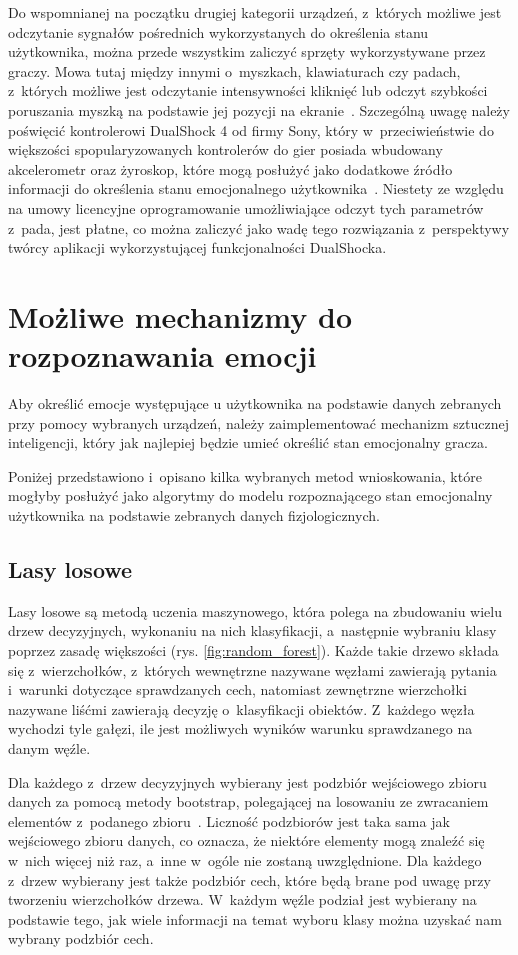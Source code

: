 Do wspomnianej na początku drugiej kategorii urządzeń, z~których możliwe jest odczytanie sygnałów pośrednich wykorzystanych do określenia stanu użytkownika, można przede wszystkim zaliczyć sprzęty wykorzystywane przez graczy. Mowa tutaj między innymi o~myszkach, klawiaturach czy padach, z~których możliwe jest odczytanie intensywności kliknięć lub odczyt szybkości poruszania myszką na podstawie jej pozycji na ekranie~\cite{measuring_emotion_from_gamepad}. Szczególną uwagę należy poświęcić kontrolerowi DualShock 4 od firmy Sony, który w~przeciwieństwie do większości spopularyzowanych kontrolerów do gier posiada wbudowany akcelerometr oraz żyroskop, które mogą posłużyć jako dodatkowe źródło informacji do określenia stanu emocjonalnego użytkownika~\cite{dualshock_specification}. Niestety ze względu na umowy licencyjne oprogramowanie umożliwiające odczyt tych parametrów z~pada, jest płatne, co można zaliczyć jako wadę tego rozwiązania z~perspektywy twórcy aplikacji wykorzystującej funkcjonalności DualShocka.

\section{Możliwe mechanizmy do rozpoznawania emocji}
Aby określić emocje występujące u użytkownika na podstawie danych zebranych przy pomocy wybranych urządzeń, należy zaimplementować mechanizm sztucznej inteligencji, który jak najlepiej będzie umieć określić stan emocjonalny gracza. 

Poniżej przedstawiono i~opisano kilka wybranych metod wnioskowania, które mogłyby posłużyć jako algorytmy do modelu rozpoznającego stan emocjonalny użytkownika na podstawie zebranych danych fizjologicznych.

\subsection{Lasy losowe}
Lasy losowe są metodą uczenia maszynowego, która polega na zbudowaniu wielu drzew decyzyjnych, wykonaniu na nich klasyfikacji, a~następnie wybraniu klasy poprzez zasadę większości (rys. \ref{fig:random_forest}). Każde takie drzewo składa się z~wierzchołków, z~których wewnętrzne nazywane węzłami zawierają pytania i~warunki dotyczące sprawdzanych cech, natomiast zewnętrzne wierzchołki nazywane liśćmi zawierają decyzję o~klasyfikacji obiektów. Z~każdego węzła wychodzi tyle gałęzi, ile jest możliwych wyników warunku sprawdzanego na danym węźle.

Dla każdego z~drzew decyzyjnych wybierany jest podzbiór wejściowego zbioru danych za pomocą metody bootstrap, polegającej na losowaniu ze zwracaniem elementów z~podanego zbioru~\cite{flach_2012}. Liczność podzbiorów jest taka sama jak wejściowego zbioru danych, co oznacza, że niektóre elementy mogą znaleźć się w~nich więcej niż raz, a~inne w~ogóle nie zostaną uwzględnione. Dla każdego z~drzew wybierany jest także podzbiór cech, które będą brane pod uwagę przy tworzeniu wierzchołków drzewa. W~każdym węźle podział jest wybierany na podstawie tego, jak wiele informacji na temat wyboru klasy można uzyskać nam wybrany podzbiór cech.


